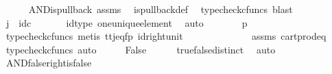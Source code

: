 \begin{isabellebody}
\ \ \ \ \isamarkupfalse%
\ AND{\isacharunderscore}{\kern0pt}is{\isacharunderscore}{\kern0pt}pullback\ assms\ \isamarkupfalse%
\ is{\isacharunderscore}{\kern0pt}pullback{\isacharunderscore}{\kern0pt}def\ \isamarkupfalse%
\ {\isacharparenleft}{\kern0pt}typecheck{\isacharunderscore}{\kern0pt}cfuncs{\isacharcomma}{\kern0pt}\ blast{\isacharparenright}{\kern0pt}\isanewline
\ \ \isamarkupfalse%
\ \isamarkupfalse%
\ {\isachardoublequoteopen}j\ {\isacharequal}{\kern0pt}\ id\isactrlsub c\ {\isasymone}{\isachardoublequoteclose}\isanewline
\ \ \ \ \isamarkupfalse%
\ id{\isacharunderscore}{\kern0pt}type\ one{\isacharunderscore}{\kern0pt}unique{\isacharunderscore}{\kern0pt}element\ \isamarkupfalse%
\ auto\isanewline
\ \ \isamarkupfalse%
\ \isamarkupfalse%
\ {\isachardoublequoteopen}{\isasymlangle}{\isasymt}{\isacharcomma}{\kern0pt}{\isasymt}{\isasymrangle}\ {\isacharequal}{\kern0pt}\ {\isasymlangle}{\isasymf}{\isacharcomma}{\kern0pt}p{\isasymrangle}{\isachardoublequoteclose}\isanewline
\ \ \ \ \isamarkupfalse%
\ {\isacharparenleft}{\kern0pt}typecheck{\isacharunderscore}{\kern0pt}cfuncs{\isacharcomma}{\kern0pt}\ metis\ tt{\isacharunderscore}{\kern0pt}j{\isacharunderscore}{\kern0pt}eq{\isacharunderscore}{\kern0pt}fp\ id{\isacharunderscore}{\kern0pt}right{\isacharunderscore}{\kern0pt}unit{}{\isacharparenright}{\kern0pt}\isanewline
\ \ \isamarkupfalse%
\ \isamarkupfalse%
\ {\isachardoublequoteopen}{\isasymt}\ {\isacharequal}{\kern0pt}\ {\isasymf}{\isachardoublequoteclose}\isanewline
\ \ \ \ \isamarkupfalse%
\ assms\ cart{\isacharunderscore}{\kern0pt}prod{\isacharunderscore}{\kern0pt}eq{}\ \isamarkupfalse%
\ {\isacharparenleft}{\kern0pt}typecheck{\isacharunderscore}{\kern0pt}cfuncs{\isacharcomma}{\kern0pt}\ auto{\isacharparenright}{\kern0pt}\isanewline
\ \ \isamarkupfalse%
\ \isamarkupfalse%
\ False\isanewline
\ \ \ \ \isamarkupfalse%
\ true{\isacharunderscore}{\kern0pt}false{\isacharunderscore}{\kern0pt}distinct\ \isamarkupfalse%
\ auto\isanewline
{}\isamarkupfalse%
%
\endisatagproof
{\isafoldproof}%
%
\isadelimproof
\isanewline
%
\endisadelimproof
\isanewline
{}\isamarkupfalse%
\ AND{\isacharunderscore}{\kern0pt}false{\isacharunderscore}{\kern0pt}right{\isacharunderscore}{\kern0pt}is{\isacharunderscore}{\kern0pt}false{\isacharcolon}{\kern0pt}\isanewline

\end{isabellebody}
